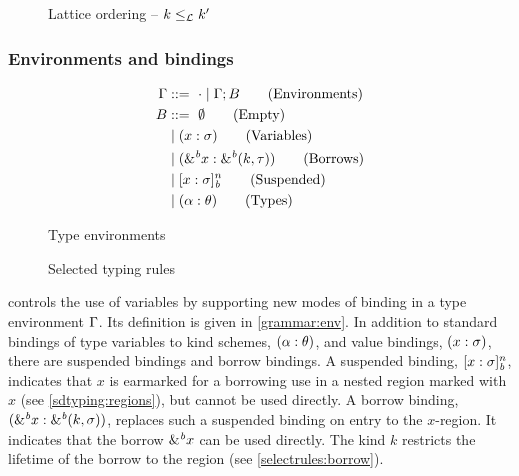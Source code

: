 \begin{figure}[tp]
  
  \caption{Lattice ordering -- $k \leq_\mathcal L k'$}
  \label{sdtyp:lattice}
\end{figure}


\subsubsection{Environments and bindings}
\label{sdtyping:envs}
\begin{figure*}[tp]
  \begin{minipage}{0.28\linewidth}
    \begin{align*}
      \Gamma &::=\ \cdot \mid \Gamma;B\tag{Environments}\\
      B &::=\ \emptyset \tag{Empty} \\
         &\mid (x : \sigma)\tag{Variables}\\
         &\mid ({\&}^{\textit{b}}x : {\&}^{\textit{b}}(k,\tau))\tag{Borrows}\\
         &\mid [x : \sigma]_{\textit{b}}^n \tag{Suspended}\\
         &\mid (\alpha : \theta)\tag{Types}
    \end{align*}
    \caption{Type environments}
    \label{grammar:env}
  \end{minipage}\hfill
  \begin{minipage}{0.7\linewidth}
    \caption{Selected typing rules}
    \label{selectrules:borrow}
    \label{selectrules:binders}
    \label{sdtyp:pair}
    \label{selectrules:region}
    \label{selectrules:matching}
  \end{minipage}
\end{figure*}

\lang controls the use of variables by supporting new modes of
binding in a type environment $\Gamma$.
Its definition is given in  \cref{grammar:env}.
In addition to standard bindings of type variables to kind schemes,
$(\alpha : \theta)$,  and value bindings, $(x : \sigma)$, there
are suspended bindings and borrow bindings.
A suspended binding, $[x : \sigma]_{\textit{b}}^n$, indicates that $x$ is
earmarked for a borrowing use in a nested region
marked with $x$ (see \cref{sdtyping:regions}), but
cannot be used directly.
A borrow binding, $({\&}^{\textit{b}}x : {\&}^{\textit{b}}(k,\sigma))$, replaces
such a suspended binding on entry to the $x$-region. It indicates
that the borrow ${\&}^{\textit{b}}x$ can be used directly. The kind $k$
restricts the lifetime of the borrow to the region (see \cref{selectrules:borrow}).

